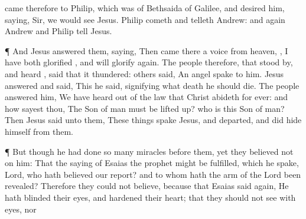 {came
therefore to
Philip, which was
of
Bethsaida of
Galilee,
and
desired
him,
saying,
Sir, we
would
see
Jesus.
Philip
cometh
and
telleth
Andrew:
and
again
Andrew
and
Philip
tell
Jesus.
\par }{\PP {}¶
And
Jesus
answered
them,
saying,
{}
Then came
there a
voice
from
heaven,
{}, I
have
both
glorified
{},
and will
glorify
{}
again.
The
people
therefore, that stood
by,
and
heard
{}, said
that
it
thundered:
others
said, An
angel
spake to
him.
Jesus
answered
and
said,
{}
This he
said,
signifying
what
death he
should
die.
The
people
answered
him,
We have
heard
out of the
law
that
Christ
abideth
for
ever:
and
how
sayest
thou, The
Son of
man
must be lifted
up?
who
is
this
Son of
man?
Then
Jesus
said unto
them,
{}
 These
things
spake
Jesus,
and
departed, and did hide
himself
from
them.
\par }{\PP {}¶
But
though
he had
done so
many
miracles
before
them, yet they
believed
not
on
him:
That the
saying of
Esaias the
prophet might be
fulfilled,
which he
spake,
Lord,
who hath
believed
our
report?
and to
whom
hath the
arm of the
Lord been
revealed?
Therefore they
could
not
believe,
because
that
Esaias
said
again,
He hath
blinded
their
eyes,
and
hardened
their
heart;
that they
should
not
see
with
{}
eyes,
nor
}
